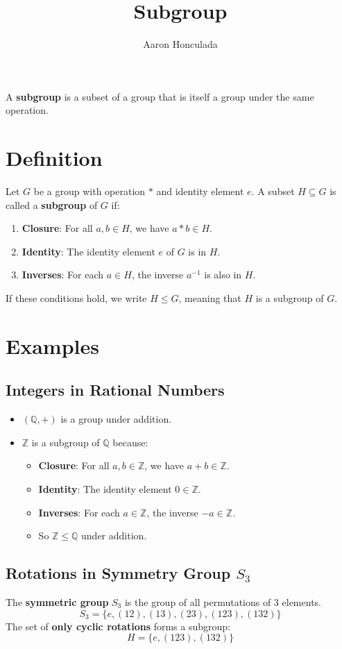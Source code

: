 \documentclass{article}
\title{Subgroup}
\author{Aaron Honculada}
\date{\monthname[\month] \the\year}
\begin{document}
\maketitle

A \textbf{subgroup} is a subset of a group that is itself a group under the same operation.
\section{Definition}
Let $G$ be a group with operation $*$ and identity element $e$. A subset $H \subseteq G$ is called 
a \textbf{subgroup} of $G$ if:
\begin{enumerate}
    \item \textbf{Closure}: For all $a, b \in H$, we have $a * b \in H$.
    \item \textbf{Identity}: The identity element $e$ of $G$ is in $H$.
    \item \textbf{Inverses}: For each $a \in H$, the inverse $a^{-1}$ is also in $H$.
\end{enumerate}
If these conditions hold, we write $H \leq G$, meaning that $H$ is a subgroup of $G$.

\section{Examples}
\subsection{Integers in Rational Numbers}
\begin{itemize}
    \item $(\mathbb{Q}, +)$ is a group under addition.
    \item $\mathbb{Z}$ is a subgroup of $\mathbb{Q}$ because:
    \begin{itemize}
        \item \textbf{Closure}: For all $a, b \in \mathbb{Z}$, we have $a + b \in \mathbb{Z}$.
        \item \textbf{Identity}: The identity element $0 \in \mathbb{Z}$.
        \item \textbf{Inverses}: For each $a \in \mathbb{Z}$, the inverse $-a \in \mathbb{Z}$.
        \item So $\mathbb{Z} \leq \mathbb{Q}$ under addition.
    \end{itemize}
\end{itemize}

\subsection{Rotations in Symmetry Group \texorpdfstring{$S_3$}{S3}}
\label{subsec:rotations_s3}
The \textbf{symmetric group} $S_3$ is the group of all permutations of 3 elements.
\[
    S_3 = \{e, (12), (13), (23), (123), (132)\}
\]
The set of \textbf{only cyclic rotations} forms a subgroup:
\[
    H = \{e, (123), (132)\}
\]
\end{document}
